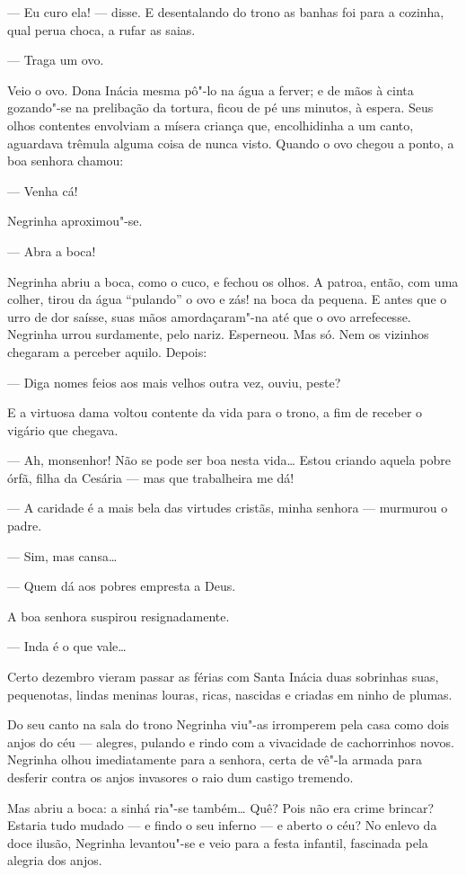 --- Eu curo ela! --- disse. E desentalando do trono as banhas foi para a
cozinha, qual perua choca, a rufar as saias.

--- Traga um ovo.

Veio o ovo. Dona Inácia mesma pô"-lo na água a ferver; e de mãos à cinta
gozando"-se na prelibação da tortura, ficou de pé uns minutos, à espera.
Seus olhos contentes envolviam a mísera criança que, encolhidinha a um
canto, aguardava trêmula alguma coisa de nunca visto. Quando o ovo
chegou a ponto, a boa senhora chamou:

--- Venha cá!

Negrinha aproximou"-se.

--- Abra a boca!

Negrinha abriu a boca, como o cuco, e fechou os olhos. A patroa, então,
com uma colher, tirou da água ``pulando'' o ovo e zás! na boca da
pequena. E antes que o urro de dor saísse, suas mãos amordaçaram"-na até
que o ovo arrefecesse. Negrinha urrou surdamente, pelo nariz. Esperneou.
Mas só. Nem os vizinhos chegaram a perceber aquilo. Depois:

--- Diga nomes feios aos mais velhos outra vez, ouviu, peste?

E a virtuosa dama voltou contente da vida para o trono, a fim de receber
o vigário que chegava.

--- Ah, monsenhor! Não se pode ser boa nesta vida\ldots{} Estou criando
aquela pobre órfã, filha da Cesária --- mas que trabalheira me dá!

--- A caridade é a mais bela das virtudes cristãs, minha senhora ---
murmurou o padre.

--- Sim, mas cansa\ldots{}

--- Quem dá aos pobres empresta a Deus.

A boa senhora suspirou resignadamente.

--- Inda é o que vale\ldots{}

Certo dezembro vieram passar as férias com Santa Inácia duas sobrinhas
suas, pequenotas, lindas meninas louras, ricas, nascidas e criadas em
ninho de plumas.

Do seu canto na sala do trono Negrinha viu"-as irromperem pela casa como
dois anjos do céu --- alegres, pulando e rindo com a vivacidade de
cachorrinhos novos. Negrinha olhou imediatamente para a senhora, certa
de vê"-la armada para desferir contra os anjos invasores o raio dum
castigo tremendo.

Mas abriu a boca: a sinhá ria"-se também\ldots{} Quê? Pois não era crime
brincar? Estaria tudo mudado --- e findo o seu inferno --- e aberto o
céu? No enlevo da doce ilusão, Negrinha levantou"-se e veio para a festa
infantil, fascinada pela alegria dos anjos.

